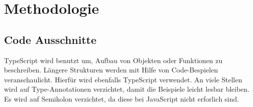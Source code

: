 \chapter{Methodologie}

\section{Code Ausschnitte}

TypeScript wird benutzt um, Aufbau von Objekten oder Funktionen zu beschreiben. Längere Strukturen werden mit Hilfe von Code-Bespielen veranschaulicht. Hierfür wird ebenfalls TypeScript verwendet. An viele Stellen wird auf Type-Annotationen verzichtet, damit die Beispiele leicht lesbar bleiben. Es wird auf Semikolon verzichtet, da diese bei JavaScript nicht erforlich sind.